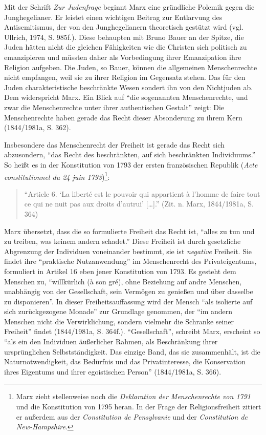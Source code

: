 \documentclass[ngerman,12pt, titlepage, smallheadings, nomath]{scrartcl}
\begin{document}
Mit der Schrift \emph{Zur Judenfrage} beginnt Marx eine gründliche
Polemik gegen die Junghegelianer. Er leistet einen wichtigen Beitrag zur
Entlarvung des Antisemitismus, der von den Junghegelianern theoretisch
gestützt wird (vgl. Ullrich, 1974, S. 985f.). Diese behaupten mit Bruno
Bauer an der Spitze, die Juden hätten nicht die gleichen Fähigkeiten wie
die Christen sich politisch zu emanzipieren und müssten daher als
Vorbedingung ihrer Emanzipation ihre Religion aufgeben. Die Juden, so
Bauer, können die allgemeinen Menschenrechte nicht empfangen, weil sie
zu ihrer Religion im Gegensatz stehen. Das für den Juden
charakteristische beschränkte Wesen sondert ihn von den Nichtjuden ab.
Dem widerspricht Marx. Ein Blick auf \enquote{die sogenannten
Menschenrechte, und zwar die Menschenrechte unter ihrer authentischen
Gestalt} zeigt: Die Menschenrechte haben gerade das Recht dieser
Absonderung zu ihrem Kern (1844/1981a, S. 362).

Insbesondere das Menschenrecht der Freiheit ist gerade das Recht sich
abzusondern, \enquote{das Recht des beschränkten, auf sich beschränkten
Individuums.} So heißt es in der Konstitution von 1793 der ersten
französischen Republik (\emph{Acte constitutionnel du 24 juin
1793})\footnote{Marx zieht stellenweise noch die \emph{Deklaration der
  Menschenrechte von 1791} und die Konstitution von 1795 heran. In der
  Frage der Religionsfreiheit zitiert er außerdem aus der
  \emph{Constitution de Pensylvanie} und der \emph{Constitution de
  New-Hampshire}.}:

\begin{quote}
\enquote{Article 6. \enquote{La liberté est le pouvoir qui appartient à
l'homme de faire tout ce qui ne nuit pas aux droits d'autrui}
{[}\ldots{}{]}.} (Zit. n. Marx, 1844/1981a, S. 364)
\end{quote}

\noindent Marx übersetzt, dass die so formulierte Freiheit das Recht
ist, \enquote{alles zu tun und zu treiben, was keinem andern schadet.}
Diese Freiheit ist durch gesetzliche Abgrenzung der Individuen
voneinander bestimmt, sie ist \emph{negative} Freiheit. Sie findet ihre
\enquote{praktische Nutzanwendung} im Menschenrecht des Privateigentums,
formuliert in Artikel 16 eben jener Konstitution von 1793. Es gesteht
dem Menschen zu, \enquote{willkürlich (à son gré), ohne Beziehung auf
andre Menschen, unabhängig von der Gesellschaft, sein Vermögen zu
genießen und über dasselbe zu disponieren}. In dieser
Freiheitsauffassung wird der Mensch \enquote{als isolierte auf sich
zurückgezogene Monade} zur Grundlage genommen, der \enquote{im andern
Menschen nicht die Verwirklichung, sondern vielmehr die Schranke seiner
Freiheit} findet (1844/1981a, S. 364f.). \enquote{Gesellschaft},
schreibt Marx, erscheint so \enquote{als ein den Individuen äußerlicher
Rahmen, als Beschränkung ihrer ursprünglichen Selbstständigkeit. Das
einzige Band, das sie zusammenhält, ist die Naturnotwendigkeit, das
Bedürfnis und das Privatinteresse, die Konservation ihres Eigentums und
ihrer egoistischen Person} (1844/1981a, S. 366).
\end{document}
